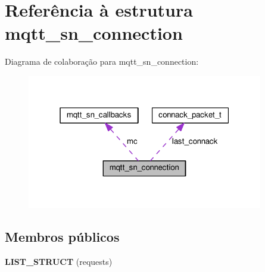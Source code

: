 \hypertarget{structmqtt__sn__connection}{\section{Referência à estrutura mqtt\+\_\+sn\+\_\+connection}
\label{structmqtt__sn__connection}
}


Diagrama de colaboração para mqtt\+\_\+sn\+\_\+connection\+:\nopagebreak
\begin{figure}[H]
\begin{center}
\leavevmode
\includegraphics[width=292pt]{structmqtt__sn__connection__coll__graph}
\end{center}
\end{figure}
\subsection*{Membros públicos}
\begin{DoxyCompactItemize}
\item 
\hypertarget{structmqtt__sn__connection_ae825853452efa9c82bcaf89a50fef185}{{\bfseries L\+I\+S\+T\+\_\+\+S\+T\+R\+U\+C\+T} (requests)}\label{structmqtt__sn__connection_ae825853452efa9c82bcaf89a50fef185}

\end{DoxyCompactItemize}
